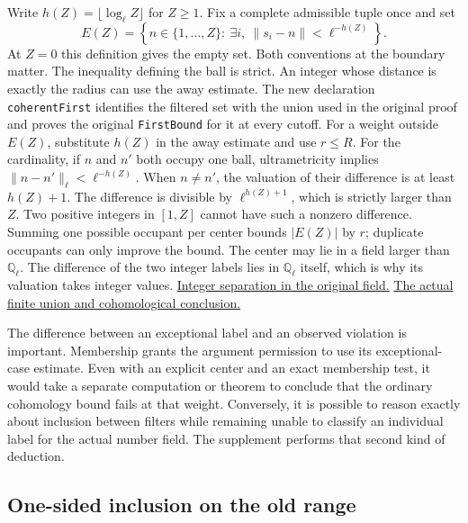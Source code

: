 \documentclass[12pt,letterpaper]{article}
\begin{document}
Write $h(Z)=\lfloor\log_\ell Z\rfloor$ for $Z\ge1$. Fix a complete admissible tuple once and set
\[
 E(Z)=\left\{n\in\{1,\ldots,Z\}:
                \ \exists i,\ \|s_i-n\|<\ell^{-h(Z)}\right\}.
\]
At $Z=0$ this definition gives the empty set. Both conventions at the boundary matter. The inequality defining the ball is strict. An integer whose distance is exactly the radius can use the away estimate. The new declaration \texttt{coherentFirst} identifies the filtered set with the union used in the original proof and proves the original \texttt{FirstBound} for it at every cutoff. For a weight outside $E(Z)$, substitute $h(Z)$ in the away estimate and use $r\le R$. For the cardinality, if $n$ and $n'$ both occupy one ball, ultrametricity implies $\|n-n'\|_\ell<\ell^{-h(Z)}$. When $n\ne n'$, the valuation of their difference is at least $h(Z)+1$. The difference is divisible by $\ell^{h(Z)+1}$, which is strictly larger than $Z$. Two positive integers in $[1,Z]$ cannot have such a nonzero difference. Summing one possible occupant per center bounds $|E(Z)|$ by $r$; duplicate occupants can only improve the bound. The center may lie in a field larger than $\mathbb Q_\ell$. The difference of the two integer labels lies in $\mathbb Q_\ell$ itself, which is why its valuation takes integer values. \href{https://github.com/nousentllc/riemann-hypothesis/blob/40e56bab026552e089d7afcfeff08d2defb9c005/src/Development/AutomorphicArithmetic/AutomorphicVarieties/LayeredIsomorphisms/Near1.lean#L6-L43}{Integer separation in the original field.} \href{https://github.com/nousentllc/riemann-hypothesis/blob/40e56bab026552e089d7afcfeff08d2defb9c005/src/Development/AutomorphicArithmetic/AutomorphicVarieties/LayeredIsomorphisms/Exc.lean#L7-L42}{The actual finite union and cohomological conclusion.}

The difference between an exceptional label and an observed violation is important. Membership grants the argument permission to use its exceptional-case estimate. Even with an explicit center and an exact membership test, it would take a separate computation or theorem to conclude that the ordinary cohomology bound fails at that weight. Conversely, it is possible to reason exactly about inclusion between filters while remaining unable to classify an individual label for the actual number field. The supplement performs that second kind of deduction.

\subsection{One-sided inclusion on the old range}
\end{document}
